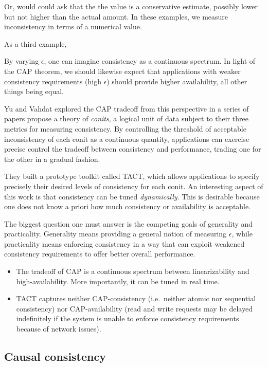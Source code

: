\documentclass[]             %
{NASA}                       %
\theoremstyle{definition}
\begin{document}
Or, would could ask that the the value is a conservative estimate,
possibly lower but not higher than the actual amount. In these examples,
we measure inconsistency in terms of a numerical value.

As a third example,

By varying \(\epsilon\), one can imagine consistency as a continuous
spectrum. In light of the CAP theorem, we should likewise expect that
applications with weaker consistency requirements (high \(\epsilon\))
should provide higher availability, all other things being equal.

Yu and Vahdat explored the CAP tradeoff from this perspective in a
series of papers \cite{2000tact 2000tactalgorithms 10.5555/1251229.1251250 DBLP:conf/icdcs/YuV01 2002tact}
propose a theory of \emph{conits}, a logical unit of data subject to
their three metrics for measuring consistency. By controlling the
threshold of acceptable inconsistency of each conit as a continuous
quantity, applications can exercise precise control the tradeoff between
consistency and performance, trading one for the other in a gradual
fashion.

They built a prototype toolkit called TACT, which allows applications to
specify precisely their desired levels of consistency for each conit. An
interesting aspect of this work is that consistency can be tuned
\emph{dynamically}. This is desirable because one does not know a priori
how much consistency or availability is acceptable.

The biggest question one must answer is the competing goals of
generality and practicality. Generality means providing a general notion
of measuring \(\epsilon\), while practicality means enforcing
consistency in a way that can exploit weakened consistency requirements
to offer better overall performance.

\begin{itemize}
\item
  The tradeoff of CAP is a continuous spectrum between linearizability
  and high-availability. More importantly, it can be tuned in real time.
\item
  TACT captures neither CAP-consistency (i.e.~neither atomic nor
  sequential consistency) nor CAP-availability (read and write requests
  may be delayed indefinitely if the system is unable to enforce
  consistency requirements because of network issues).
\end{itemize}

\hypertarget{causal-consistency-1}{%
\subsection{Causal consistency}\label{causal-consistency-1}}
\end{document}
